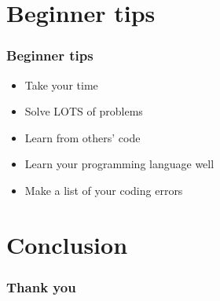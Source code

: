 \section{Beginner tips}
\begin{frame}
    \frametitle{Beginner tips}
    \begin{itemize}
        \item Take your time \\ \pause
        \item Solve LOTS of problems \\ \pause
        \item Learn from others' code \\ \pause
        \item Learn your programming language well \\ \pause
        \item Make a list of your coding errors \\
    \end{itemize}
\end{frame}

\section{Conclusion}
\begin{frame}
    \frametitle{Thank you}
\end{frame}



